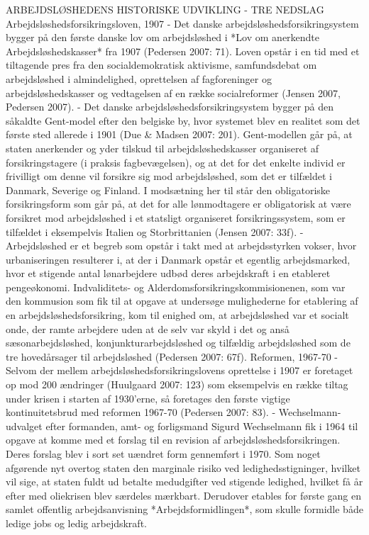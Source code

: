 ARBEJDSLØSHEDENS HISTORISKE UDVIKLING - TRE NEDSLAG
Arbejdsløshedsforsikringsloven, 1907
- Det danske arbejdsløshedsforsikringsystem bygger på den første danske lov om arbejdsløshed i *Lov om anerkendte Arbejdsløshedskasser* fra 1907 (Pedersen 2007: 71). Loven opstår i en tid med et tiltagende pres fra den socialdemokratisk aktivisme, samfundsdebat om arbejdsløshed i almindelighed, oprettelsen af fagforeninger og arbejdsløshedskasser og vedtagelsen af en række socialreformer (Jensen 2007, Pedersen 2007).
- Det danske arbejdsløshedsforsikringsystem bygger på den såkaldte Gent-model efter den belgiske by, hvor systemet blev en realitet som det første sted allerede i 1901 (Due & Madsen 2007: 201). Gent-modellen går på, at staten anerkender og yder tilskud til arbejdsløshedskasser organiseret af forsikringstagere (i praksis fagbevægelsen), og at det for det enkelte individ er frivilligt om denne vil forsikre sig mod arbejdsløshed, som det er tilfældet i Danmark, Severige og Finland. I modsætning her til står den obligatoriske forsikringsform som går på, at det for alle lønmodtagere er obligatorisk at være forsikret mod arbejdsløshed i et statsligt organiseret forsikringssystem, som er tilfældet i eksempelvis Italien og Storbrittanien (Jensen 2007: 33f).
- Arbejdsløshed er et begreb som opstår i takt med at arbejdsstyrken vokser, hvor urbaniseringen resulterer i, at der i Danmark opstår et egentlig arbejdsmarked, hvor et stigende antal lønarbejdere udbød deres arbejdskraft i en etableret pengeøkonomi. Indvaliditets- og Alderdomsforsikringskommisionenen, som var den kommusion som fik til at opgave at undersøge mulighederne for etablering af en arbejdsløshedsforsikring, kom til enighed om, at arbejdsløshed var et socialt onde, der ramte arbejdere uden at de selv var skyld i det og anså sæsonarbejdsløshed, konjunkturarbejdsløshed og tilfældig arbejdsløshed som de tre hovedårsager til arbejdsløshed (Pedersen 2007: 67f).
Reformen, 1967-70
- Selvom der mellem arbejdsløshedsforsikringslovens oprettelse i 1907 er foretaget op mod 200 ændringer (Huulgaard 2007: 123) som eksempelvis en række tiltag under krisen i starten af 1930'erne, så foretages den første vigtige kontinuitetsbrud med reformen 1967-70 (Pedersen 2007: 83).
- Wechselmann-udvalget efter formanden, amt- og forligsmand Sigurd Wechselmann fik i 1964 til opgave at komme med et forslag til en revision af arbejdsløshedsforsikringen. Deres forslag blev i sort set uændret form gennemført i 1970. Som noget afgørende nyt overtog staten den marginale risiko ved ledighedsstigninger, hvilket vil sige, at staten fuldt ud betalte medudgifter ved stigende ledighed, hvilket få år efter med oliekrisen blev særdeles mærkbart. Derudover etables for første gang en samlet offentlig arbejdsanvisning *Arbejdsformidlingen*, som skulle formidle både ledige jobs og ledig arbejdskraft.  
